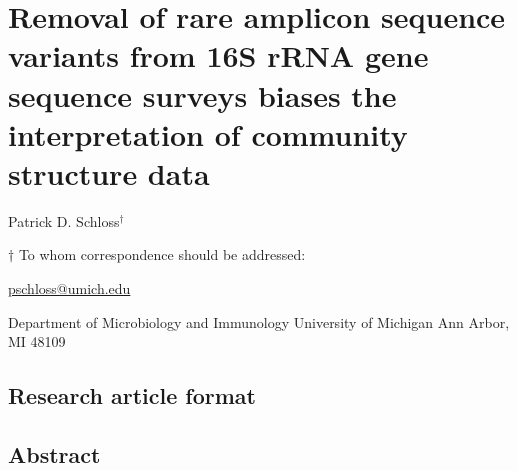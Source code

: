 \documentclass[
]{article}
\author{}
\date{\vspace{-2.5em}}
\begin{document}
\hypertarget{removal-of-rare-amplicon-sequence-variants-from-16s-rrna-gene-sequence-surveys-biases-the-interpretation-of-community-structure-data}{%
\section{Removal of rare amplicon sequence variants from 16S rRNA gene
sequence surveys biases the interpretation of community structure
data}\label{removal-of-rare-amplicon-sequence-variants-from-16s-rrna-gene-sequence-surveys-biases-the-interpretation-of-community-structure-data}}

\vspace{35mm}

Patrick D. Schloss\({^\dagger}\)

\vspace{40mm}

\(\dagger\) To whom correspondence should be addressed:

\href{mailto:pschloss@umich.edu}{pschloss@umich.edu}

Department of Microbiology and Immunology University of Michigan Ann
Arbor, MI 48109

\vspace{35mm}

\hypertarget{research-article-format}{%
\subsection{Research article format}\label{research-article-format}}

\newpage

\hypertarget{abstract}{%
\subsection{Abstract}\label{abstract}}
\end{document}
